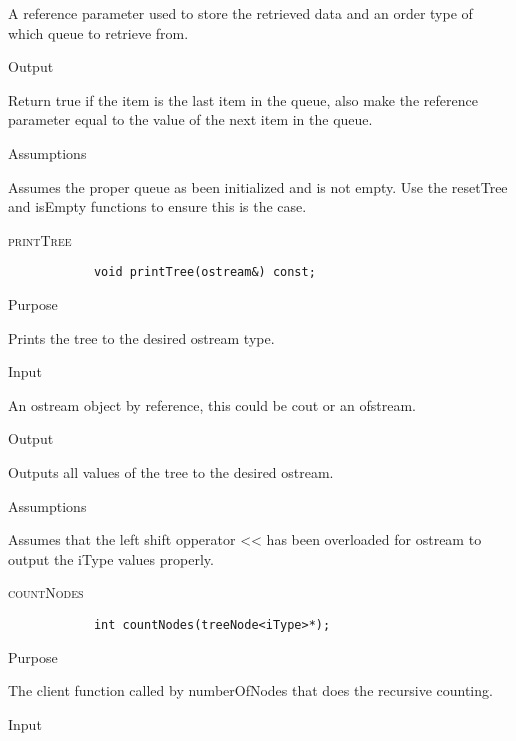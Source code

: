 \documentclass[pdftex, 12pt]{article}
\begin{document}
\begin{description}
\begin{description}
				A reference parameter used to store the retrieved data and an order type of which queue to retrieve
				from.

			\item{Output}

				Return true if the item is the last item in the queue, also make the reference parameter equal to the
				value of the next item in the queue.

			\item{Assumptions}

				Assumes the proper queue as been initialized and is not empty.  Use the resetTree and isEmpty functions
				to ensure this is the case.

		\end{description}
	\item{\textsc{printTree}}
		\begin{lstlisting}
			void printTree(ostream&) const;
		\end{lstlisting}
		\begin{description}

			\item{Purpose}

				Prints the tree to the desired ostream type.

			\item{Input}

				An ostream object by reference, this could be cout or an ofstream.

			\item{Output}

				Outputs all values of the tree to the desired ostream.

			\item{Assumptions}

				Assumes that the left shift opperator << has been overloaded for ostream to output the iType values
				properly.

		\end{description}
	\item{\textsc{countNodes}}
		\begin{lstlisting}
			int countNodes(treeNode<iType>*);
		\end{lstlisting}
		\begin{description}

			\item{Purpose}

				The client function called by numberOfNodes that does the recursive counting.

			\item{Input}


\end{description}
\end{description}
\end{document}
